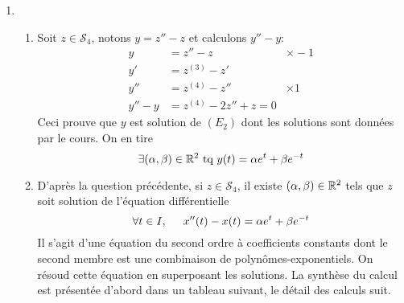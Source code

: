 \begin{enumerate}
  \item 
\begin{enumerate}
  \item Soit $z\in \mathcal{S}_4$, notons $y=z'' - z$ et calculons $y'' -y$:
\begin{align*}
  y &= z'' - z &\times -1 \\
  y' &= z^{(3)} -z' \\
  y'' &= z^{(4)} - z'' &\times 1 \\ \hline
  y'' - y &= z^{(4)} - 2z'' +z = 0 
\end{align*}
Ceci prouve que $y$ est solution de $(E_2)$ dont les solutions sont données par le cours. On en tire
\begin{displaymath}
\exists (\alpha,\beta)\in \mathbb{R}^2 \text{ tq } y(t) = \alpha e^{t} + \beta e^{-t}  
\end{displaymath}

  \item D'après la question précédente, si $z\in \mathcal{S}_4$, il existe $(\alpha,\beta)\in \mathbb{R}^2$ tels que $z$ soit solution de l'équation différentielle
\begin{displaymath}
\forall t\in I, \hspace{0.5cm} x''(t) - x(t) = \alpha e^{t} + \beta e^{-t}  
\end{displaymath}
Il s'agit d'une équation du second ordre à coefficients constants dont le second membre est une combinaison de polynômes-exponentiels. On résoud cette équation en superposant les solutions.\newline
La synthèse du calcul est présentée d'abord dans un tableau suivant, le détail des calculs suit.


\end{enumerate}
\end{enumerate}
